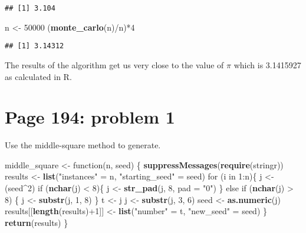 \documentclass[]{article}
\newenvironment{Shaded}{\begin{snugshade}}{\end{snugshade}}
\newcommand{\KeywordTok}[1]{\textcolor[rgb]{0.13,0.29,0.53}{\textbf{{#1}}}}
\newcommand{\DataTypeTok}[1]{\textcolor[rgb]{0.13,0.29,0.53}{{#1}}}
\newcommand{\DecValTok}[1]{\textcolor[rgb]{0.00,0.00,0.81}{{#1}}}
\newcommand{\StringTok}[1]{\textcolor[rgb]{0.31,0.60,0.02}{{#1}}}
\newcommand{\NormalTok}[1]{{#1}}
\begin{document}
\begin{verbatim}
## [1] 3.104
\end{verbatim}

\begin{Shaded}
\begin{Highlighting}[]
\NormalTok{n <-}\StringTok{ }\DecValTok{50000}
\NormalTok{(}\KeywordTok{monte_carlo}\NormalTok{(n)/n)*}\DecValTok{4}
\end{Highlighting}
\end{Shaded}

\begin{verbatim}
## [1] 3.14312
\end{verbatim}

The results of the algorithm get us very close to the value of \(\pi\)
which is 3.1415927 as calculated in R.

\newpage

\section{Page 194: problem 1}\label{page-194-problem-1}

Use the middle-square method to generate.

\begin{Shaded}
\begin{Highlighting}[]
\NormalTok{middle_square <-}\StringTok{ }\NormalTok{function(n, seed) \{}
          \KeywordTok{suppressMessages}\NormalTok{(}\KeywordTok{require}\NormalTok{(stringr))}
          \NormalTok{results <-}\StringTok{ }\KeywordTok{list}\NormalTok{(}\StringTok{"instances"} \NormalTok{=}\StringTok{ }\NormalTok{n, }\StringTok{"starting_seed"} \NormalTok{=}\StringTok{ }\NormalTok{seed)}
          \NormalTok{for (i in }\DecValTok{1}\NormalTok{:n)\{}
            \NormalTok{j <-}\StringTok{ }\NormalTok{(seed^}\DecValTok{2}\NormalTok{)}
              \NormalTok{if (}\KeywordTok{nchar}\NormalTok{(j) <}\StringTok{ }\DecValTok{8}\NormalTok{)\{}
                  \NormalTok{j <-}\StringTok{ }\KeywordTok{str_pad}\NormalTok{(j, }\DecValTok{8}\NormalTok{, }\DataTypeTok{pad =} \StringTok{"0"}\NormalTok{)}
              \NormalTok{\} else if (}\KeywordTok{nchar}\NormalTok{(j) >}\StringTok{ }\DecValTok{8}\NormalTok{) \{}
                \NormalTok{j <-}\StringTok{ }\KeywordTok{substr}\NormalTok{(j, }\DecValTok{1}\NormalTok{, }\DecValTok{8}\NormalTok{)}
              \NormalTok{\}}
            \NormalTok{t <-}\StringTok{ }\NormalTok{j }
            \NormalTok{j <-}\StringTok{ }\KeywordTok{substr}\NormalTok{(j, }\DecValTok{3}\NormalTok{, }\DecValTok{6}\NormalTok{)}
            \NormalTok{seed <-}\StringTok{ }\KeywordTok{as.numeric}\NormalTok{(j)}
            \NormalTok{results[[}\KeywordTok{length}\NormalTok{(results)+}\DecValTok{1}\NormalTok{]] <-}\StringTok{ }\KeywordTok{list}\NormalTok{(}\StringTok{"number"} \NormalTok{=}\StringTok{ }\NormalTok{t, }\StringTok{"new_seed"} \NormalTok{=}\StringTok{ }\NormalTok{seed)}
          \NormalTok{\}}
         \KeywordTok{return}\NormalTok{(results)}
\NormalTok{\}}
\end{Highlighting}
\end{Shaded}
\end{document}
